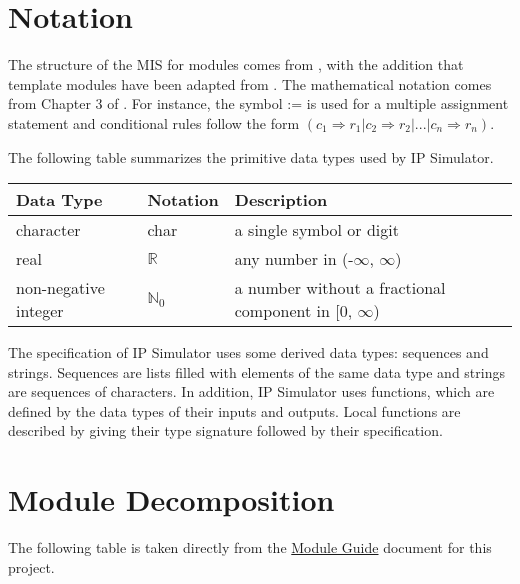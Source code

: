 \documentclass[12pt, titlepage]{article}
\begin{document}
\section{Notation}

The structure of the MIS for modules comes from \citet{HoffmanAndStrooper1995},
with the addition that template modules have been adapted from
\cite{GhezziEtAl2003}.  The mathematical notation comes from Chapter 3 of
\citet{HoffmanAndStrooper1995}.  For instance, the symbol := is used for a
multiple assignment statement and conditional rules follow the form $(c_1
\Rightarrow r_1 | c_2 \Rightarrow r_2 | ... | c_n \Rightarrow r_n )$.

The following table summarizes the primitive data types used by IP Simulator. 

\begin{center}
\renewcommand{\arraystretch}{1.2}
\noindent 
\begin{tabular}{l l p{7.5cm}} 
\toprule 
\textbf{Data Type} & \textbf{Notation} & \textbf{Description}\\ 
\midrule
character & char & a single symbol or digit\\
real & $\mathbb{R}$ & any number in (-$\infty$, $\infty$)\\
non-negative integer& $\mathbb{N}_0$ &a number without a fractional component in [0, $\infty$)\\
\bottomrule
\end{tabular} 
\end{center}

\noindent
The specification of IP Simulator uses some derived data types: sequences and strings. Sequences are lists filled with elements of the same data type and strings are sequences of characters. In addition, IP Simulator uses functions, which are defined by the data types of their inputs and outputs. Local functions are described by giving their type signature followed by their specification.

\section{Module Decomposition}

The following table is taken directly from the \href{https://github.com/MinMah23/CAS741-Project/blob/main/docs/Design/SoftArchitecture/MG.pdf}{Module Guide} document for this project.
\end{document}
